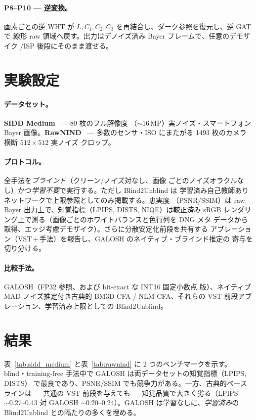 \documentclass[twocolumn,10pt]{ltjsarticle}
\begin{document}
\paragraph{P8--P10 --- 逆変換。}
画素ごとの逆 WHT が $L,C_1,C_2,C_3$ を再結合し、ダーク参照を復元し、逆 GAT で
線形 raw 領域へ戻す。出力はデノイズ済み Bayer フレームで、任意のデモザイク
/ISP 後段にそのまま渡せる。

\section{実験設定}\label{sec:exp}
\paragraph{データセット。}\textbf{SIDD Medium}~\cite{sidd} --- 80 枚のフル解像度
（$\sim$16\,MP）実ノイズ・スマートフォン Bayer 画像。\textbf{RawNIND}~\cite{rawnind}
--- 多数のセンサ・ISO にまたがる 1493 枚のカメラ横断 $512{\times}512$ 実ノイズ
クロップ。

\paragraph{プロトコル。}全手法を\emph{ブラインド}（クリーン/ノイズ対なし、画像
ごとのノイズオラクルなし）かつ\emph{学習不要}で実行する。ただし Blind2Unblind は
学習済み自己教師ありネットワークで上限参照としてのみ掲載する。忠実度
（PSNR/SSIM）は raw Bayer 出力上で、知覚指標（LPIPS, DISTS, NIQE）は較正済み
sRGB レンダリング上で測る（画像ごとのホワイトバランスと色行列を DNG メタ
データから取得、エッジ考慮デモザイク）。さらに分散安定化前段を共有する
アブレーション（VST\,+\,手法）を報告し、GALOSH のネイティブ・ブラインド推定の
寄与を切り分ける。

\paragraph{比較手法。}GALOSH（FP32 参照、および bit-exact な INT16 固定小数点
版）、ネイティブ MAD ノイズ推定付き古典的 BM3D-CFA / NLM-CFA、それらの VST
前段アブレーション、学習済み上限としての Blind2Unblind。

\section{結果}\label{sec:results}
表~\ref{tab:sidd_medium} と表~\ref{tab:rawnind} に 2 つのベンチマークを示す。
blind・training-free 手法中で GALOSH は両データセットの知覚指標（LPIPS, DISTS）
で最良であり、PSNR/SSIM でも競争力がある。一方、古典的ベースラインは --- 共通の
VST 前段を与えても --- 知覚品質で大きく劣る（LPIPS $\sim\!0.27$--$0.43$ 対
GALOSH $\sim\!0.20$--$0.24$）。GALOSH は学習なしに、\emph{学習済み}の Blind2Unblind
との隔たりの多くを埋める。
\end{document}
